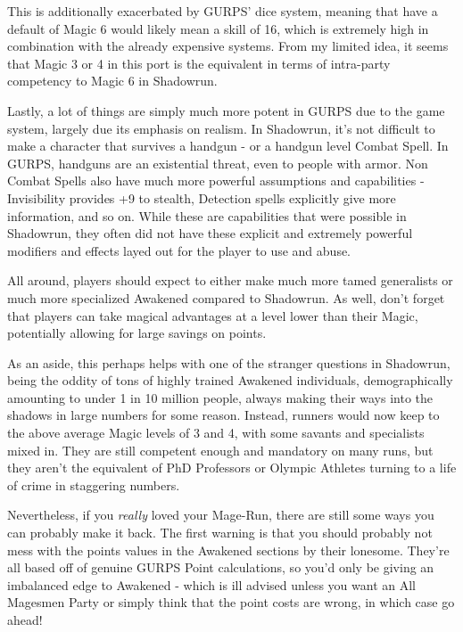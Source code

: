 \begin{multicols*}{2}
	This is additionally exacerbated by GURPS' dice system, meaning that have a default of Magic 6 would likely mean a skill of 16, which is extremely high in combination with the already expensive systems. From my limited idea, it seems that Magic 3 or 4 in this port is the equivalent in terms of intra-party competency to Magic 6 in Shadowrun.
	
	Lastly, a lot of things are simply much more potent in GURPS due to the game system, largely due its emphasis on realism. In Shadowrun, it's not difficult to make a character that survives a handgun - or a handgun level Combat Spell. In GURPS, handguns are an existential threat, even to people with armor. Non Combat Spells also have much more powerful assumptions and capabilities - Invisibility provides +9 to stealth, Detection spells explicitly give more information, and so on. While these are capabilities that were possible in Shadowrun, they often did not have these explicit and extremely powerful modifiers and effects layed out for the player to use and abuse.
	
	All around, players should expect to either make much more tamed generalists or much more specialized Awakened compared to Shadowrun. As well, don't forget that players can take magical advantages at a level lower than their Magic, potentially allowing for large savings on points.
	
	As an aside, this perhaps helps with one of the stranger questions in Shadowrun, being the oddity of tons of highly trained Awakened individuals, demographically amounting to under 1 in 10 million people, always making their ways into the shadows in large numbers for some reason. Instead, runners would now keep to the above average Magic levels of 3 and 4, with some savants and specialists mixed in. They are still competent enough and mandatory on many runs, but they aren't the equivalent of PhD Professors or Olympic Athletes turning to a life of crime in staggering numbers.
	
	Nevertheless, if you \textit{really} loved your Mage-Run, there are still some ways you can probably make it back. The first warning is that you should probably not mess with the points values in the Awakened sections by their lonesome. They're all based off of genuine GURPS Point calculations, so you'd only be giving an imbalanced edge to Awakened - which is ill advised unless you want an All Magesmen Party or simply think that the point costs are wrong, in which case go ahead! 
	

\end{multicols*}
